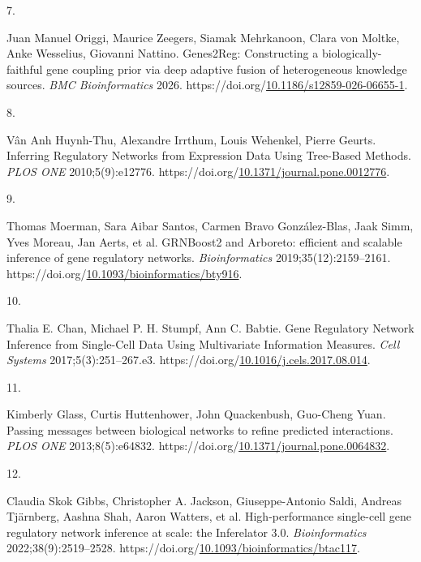 \documentclass[
  11pt,
]{article}
\newlength{\cslhangindent}
\newlength{\csllabelwidth}
\newenvironment{CSLReferences}[2] %
 {\begin{list}{}{%
  \setlength{\itemindent}{0pt}
  \setlength{\leftmargin}{0pt}
  \setlength{\parsep}{0pt}
  \ifodd #1
   \setlength{\leftmargin}{\cslhangindent}
   \setlength{\itemindent}{-1\cslhangindent}
  \fi
  \setlength{\itemsep}{#2\baselineskip}}}
 {\end{list}}
\newcommand{\CSLLeftMargin}[1]{\parbox[t]{\csllabelwidth}{\strut#1\strut}}
\newcommand{\CSLRightInline}[1]{\parbox[t]{\linewidth - \csllabelwidth}{\strut#1\strut}}
\begin{document}
\begin{CSLReferences}{0}{1}
\CSLLeftMargin{7. }%
\CSLRightInline{Juan Manuel Origgi, Maurice Zeegers, Siamak Mehrkanoon,
Clara von Moltke, Anke Wesselius, Giovanni Nattino. Genes2Reg:
Constructing a biologically-faithful gene coupling prior via deep
adaptive fusion of heterogeneous knowledge sources. \emph{BMC
Bioinformatics} 2026.
https://doi.org/\href{https://doi.org/10.1186/s12859-026-06655-1}{10.1186/s12859-026-06655-1}.}

\CSLLeftMargin{8. }%
\CSLRightInline{Vân Anh Huynh-Thu, Alexandre Irrthum, Louis Wehenkel,
Pierre Geurts. Inferring Regulatory Networks from Expression Data Using
Tree-Based Methods. \emph{PLOS ONE} 2010;5(9):e12776.
https://doi.org/\href{https://doi.org/10.1371/journal.pone.0012776}{10.1371/journal.pone.0012776}.}

\CSLLeftMargin{9. }%
\CSLRightInline{Thomas Moerman, Sara Aibar Santos, Carmen Bravo
González-Blas, Jaak Simm, Yves Moreau, Jan Aerts, et al. GRNBoost2 and
Arboreto: efficient and scalable inference of gene regulatory networks.
\emph{Bioinformatics} 2019;35(12):2159--2161.
https://doi.org/\href{https://doi.org/10.1093/bioinformatics/bty916}{10.1093/bioinformatics/bty916}.}

\CSLLeftMargin{10. }%
\CSLRightInline{Thalia E. Chan, Michael P. H. Stumpf, Ann C. Babtie.
Gene Regulatory Network Inference from Single-Cell Data Using
Multivariate Information Measures. \emph{Cell Systems}
2017;5(3):251--267.e3.
https://doi.org/\href{https://doi.org/10.1016/j.cels.2017.08.014}{10.1016/j.cels.2017.08.014}.}

\CSLLeftMargin{11. }%
\CSLRightInline{Kimberly Glass, Curtis Huttenhower, John Quackenbush,
Guo-Cheng Yuan. Passing messages between biological networks to refine
predicted interactions. \emph{PLOS ONE} 2013;8(5):e64832.
https://doi.org/\href{https://doi.org/10.1371/journal.pone.0064832}{10.1371/journal.pone.0064832}.}

\CSLLeftMargin{12. }%
\CSLRightInline{Claudia Skok Gibbs, Christopher A. Jackson,
Giuseppe-Antonio Saldi, Andreas Tjärnberg, Aashna Shah, Aaron Watters,
et al. High-performance single-cell gene regulatory network inference at
scale: the Inferelator 3.0. \emph{Bioinformatics} 2022;38(9):2519--2528.
https://doi.org/\href{https://doi.org/10.1093/bioinformatics/btac117}{10.1093/bioinformatics/btac117}.}


\end{CSLReferences}
\end{document}
